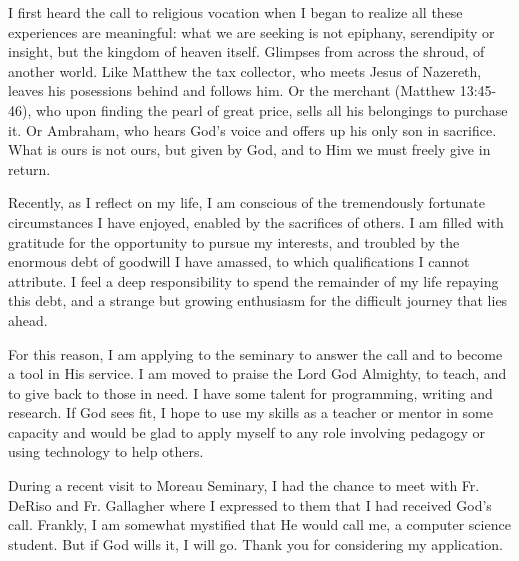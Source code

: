 \documentclass[11pt]{article}
\begin{document}
I first heard the call to religious vocation when I began to realize all these experiences are meaningful: what we are seeking is not epiphany, serendipity or insight, but the kingdom of heaven itself. Glimpses from across the shroud, of another world. Like Matthew the tax collector, who meets Jesus of Nazereth, leaves his posessions behind and follows him. Or the merchant (Matthew 13:45-46), who upon finding the pearl of great price, sells all his belongings to purchase it. Or Ambraham, who hears God's voice and offers up his only son in sacrifice. What is ours is not ours, but given by God, and to Him we must freely give in return.

Recently, as I reflect on my life, I am conscious of the tremendously fortunate circumstances I have enjoyed, enabled by the sacrifices of others. I am filled with gratitude for the opportunity to pursue my interests, and troubled by the enormous debt of goodwill I have amassed, to which qualifications I cannot attribute. I feel a deep responsibility to spend the remainder of my life repaying this debt, and a strange but growing enthusiasm for the difficult journey that lies ahead.

For this reason, I am applying to the seminary to answer the call and to become a tool in His service. I am moved to praise the Lord God Almighty, to teach, and to give back to those in need. I have some talent for programming, writing and research. If God sees fit, I hope to use my skills as a teacher or mentor in some capacity and would be glad to apply myself to any role involving pedagogy or using technology to help others.

During a recent visit to Moreau Seminary, I had the chance to meet with Fr. DeRiso and Fr. Gallagher where I expressed to them that I had received God's call. Frankly, I am somewhat mystified that He would call me, a computer science student. But if God wills it, I will go. Thank you for considering my application.
\end{document}

